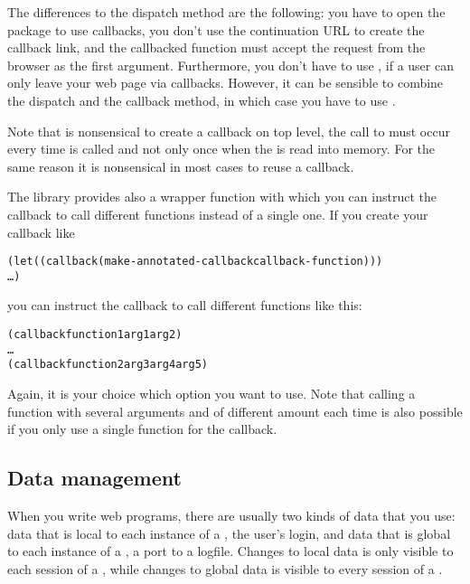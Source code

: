 The differences to the dispatch method are the following: you have to
open the  package to use callbacks, you don't
use the continuation URL to create the callback link, and the
callbacked function must accept the request from the browser as the
first argument.  Furthermore, you don't have to use
, if a user can only leave your web page via
callbacks.  However, it can be sensible to combine the dispatch and
the callback method, in which case you have to use
.

Note that is nonsensical to create a callback on top level, \ie the
call to  must occur every time
 is called and not only once when the \surflet is read into
memory.  For the same reason it is nonsensical in most cases to reuse
a callback.

The \surflet library provides also a wrapper function with which you
can instruct the callback to call different functions instead of a
single one.  If you create your callback like

\begin{alltt}
(let ((callback (make-annotated-callback callback-function)))
   \dots)
\end{alltt}

you can instruct the callback to call different functions like this:

\begin{alltt}
(callback function1 arg1 arg2)
\dots \\
(callback function2 arg3 arg4 arg5)
\end{alltt}

Again, it is your choice which option you want to use.  Note that
calling a function with several arguments and of different amount each
time is also possible if you only use a single function for the
callback.

\subsection{Data management}

When you write web programs, there are usually two kinds of data that
you use: data that is local to each instance of a \surflet, \eg the
user's login, and data that is global to each instance of a \surflet,
\eg a port to a logfile.  Changes to local data is only visible to
each session of a \surflet, while changes to global data is visible
to every session of a \surflet.

